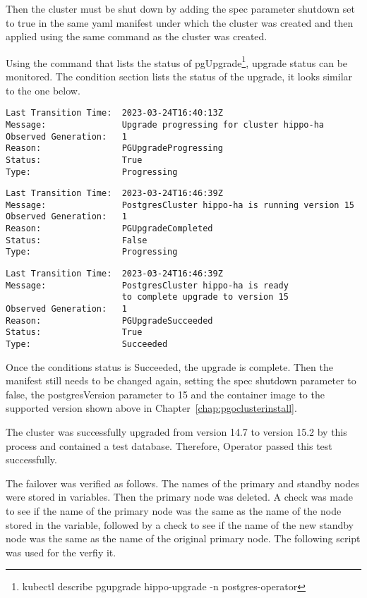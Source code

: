 Then the cluster must be shut down by adding the spec parameter shutdown set to true in the same yaml manifest under which the cluster was created and then applied using the same command as the cluster was created.

Using the command that lists the status of pgUpgrade\footnote{kubectl describe pgupgrade hippo-upgrade -n postgres-operator}, upgrade status can be monitored. The condition section lists the status of the upgrade, it looks similar to the one below.

\begin{verbatim}
Last Transition Time:  2023-03-24T16:40:13Z
Message:               Upgrade progressing for cluster hippo-ha
Observed Generation:   1
Reason:                PGUpgradeProgressing
Status:                True
Type:                  Progressing
\end{verbatim}
\begin{verbatim}
Last Transition Time:  2023-03-24T16:46:39Z
Message:               PostgresCluster hippo-ha is running version 15
Observed Generation:   1
Reason:                PGUpgradeCompleted
Status:                False
Type:                  Progressing
\end{verbatim}
\begin{verbatim}
Last Transition Time:  2023-03-24T16:46:39Z
Message:               PostgresCluster hippo-ha is ready 
                       to complete upgrade to version 15
Observed Generation:   1
Reason:                PGUpgradeSucceeded
Status:                True
Type:                  Succeeded
\end{verbatim}

Once the conditions status is Succeeded, the upgrade is complete. Then the manifest still needs to be changed again, setting the spec shutdown parameter to false, the postgresVersion parameter to 15 and the container image to the supported version shown above in Chapter~\ref{chap:pgoclusterinstall}.

The cluster was successfully upgraded from version 14.7 to version 15.2 by this process and contained a test database. Therefore, Operator passed this test successfully.

The failover was verified as follows. The names of the primary and standby nodes were stored in variables. Then the primary node was deleted. A check was made to see if the name of the primary node was the same as the name of the node stored in the variable, followed by a check to see if the name of the new standby node was the same as the name of the original primary node. The following script was used for the verfiy it.


